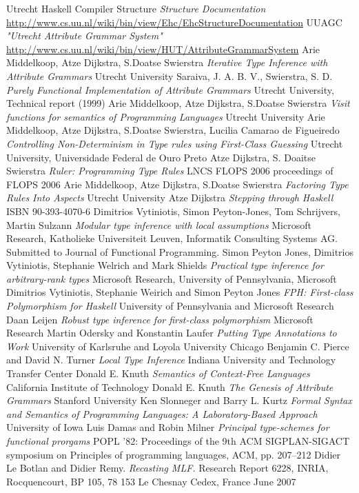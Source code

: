 ﻿\begin{thebibliography}{9}
  Utrecht Haskell Compiler Structure
  \emph{Structure Documentation}
   \url{http://www.cs.uu.nl/wiki/bin/view/Ehc/EhcStructureDocumentation}
  UUAGC
  \emph{"Utrecht Attribute Grammar System"}
   \url{http://www.cs.uu.nl/wiki/bin/view/HUT/AttributeGrammarSystem}
  Arie Middelkoop, Atze Dijkstra, S.Doatse Swierstra
  \emph{Iterative Type Inference with Attribute Grammars}
  Utrecht University
  Saraiva, J. A. B. V., Swierstra, S. D.
  \emph{Purely Functional Implementation of Attribute Grammars}
  Utrecht University, Technical report (1999)
  Arie Middelkoop, Atze Dijkstra, S.Doatse Swierstra
  \emph{Visit functions for semantics of Programming Languages}
  Utrecht University
  Arie Middelkoop, Atze Dijkstra, S.Doatse Swierstra, Lucilia Camarao de Figueiredo
  \emph{Controlling Non-Determinism in Type rules using First-Class Guessing}
  Utrecht University, Universidade Federal de Ouro Preto
  Atze Dijkstra, S. Doaitse Swierstra 
  \emph{Ruler: Programming Type Rules}
  LNCS FLOPS 2006 proceedings of FLOPS 2006
  Arie Middelkoop, Atze Dijkstra, S.Doatse Swierstra
  \emph{Factoring Type Rules Into Aspects}
  Utrecht University
  Atze Dijkstra
  \emph{Stepping through Haskell}
  ISBN 90-393-4070-6
  Dimitrios Vytiniotis, Simon Peyton-Jones, Tom Schrijvers, Martin Sulzann
  \emph{Modular type inference with local assumptions}
  Microsoft Research, Katholieke Universiteit Leuven, Informatik Consulting Systems AG.
  Submitted to Journal of Functional Programming.
  Simon Peyton Jones, Dimitrios Vytiniotis, Stephanie Welrich and Mark Shields
  \emph{Practical type inference for arbitrary-rank types}
  Microsoft Research, University of Pennsylvania, Microsoft
  Dimitrios Vytiniotis, Stephanie Weirich and Simon Peyton Jones
  \emph{FPH: First-class Polymorphism for Haskell}
  University of Pennsylvania and Microsoft Research
  Daan Leijen
  \emph{Robust type inference for first-class polymorphism}
  Microsoft Research
  Martin Odersky and Konstantin Laufer
  \emph{Putting Type Annotations to Work}
  University of Karlsruhe and Loyola University Chicago
  Benjamin C. Pierce and David N. Turner
  \emph{Local Type Inference}
  Indiana University and Technology Transfer Center
  Donald E. Knuth
  \emph{Semantics of Context-Free Languages}
  California Institute of Technology
  Donald E. Knuth
  \emph{The Genesis of Attribute Grammars}
  Stanford University
  Ken Slonneger and Barry L. Kurtz
  \emph{Formal Syntax and Semantics of Programming Languages: A Laboratory-Based Approach}
  University of Iowa
  Luis Damas and Robin Milner
  \emph{Principal type-schemes for functional prorgams}
  POPL '82: Proceedings of the 9th ACM SIGPLAN-SIGACT symposium on Principles of programming languages, ACM, pp. 207–212
  Didier Le Botlan and Didier Remy.
  \emph{Recasting MLF.}
  Research Report 6228, INRIA, Rocquencourt, BP 105, 78 153 Le Chesnay Cedex, France June 2007
\end{thebibliography}
